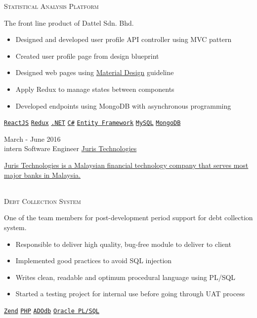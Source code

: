\documentclass[9pt]{developercv} %
\begin{document}
\begin{entrylist}
{		\textsc{Statistical Analysis Platform} \\
			{\small The front line product of Dattel Sdn. Bhd.
			\begin{itemize}
				\item Designed and developed user profile API controller using MVC pattern
				\item Created user profile page from design blueprint
				\item Designed web pages using \href{https://material.io/}{Material Design} guideline 
				\item Apply Redux to manage states between components
				\item Developed endpoints using MongoDB with asynchronous programming
			\end{itemize}}
			\texttt{\href{https://reactjs.org/}{ReactJS}}
				\slashsep
			\texttt{\href{https://redux.js.org/}{Redux}}
				\slashsep
			\texttt{\href{https://docs.microsoft.com/en-us/dotnet/standard/index}{.NET}}
				\slashsep
			\texttt{\href{https://docs.microsoft.com/en-us/dotnet/csharp/}{C\#}}
				\slashsep
			\texttt{\href{https://docs.microsoft.com/en-us/aspnet/entity-framework}{Entity Framework}}
				\slashsep
			\texttt{\href{https://www.mysql.com/}{MySQL}}
				\slashsep
			\texttt{\href{https://www.mongodb.com/}{MongoDB}}
		}
	\entry
		{March - June 2016\\\footnotesize{intern}}
		{Software Engineer}
		{\href{http://juristech.net/juristech/}{Juris Technologies}}
		{{\footnotesize{\href{http://juristech.net/juristech/about-us/}{Juris Technologies is a Malaysian financial technology company that serves most major banks in Malaysia.}}} \\
		\\ 
		{{\textsc{Debt Collection System}} \\
			{\small One of the team members for post-development period support for debt collection system.
			\begin{itemize}
				\item Responsible to deliver high quality, bug-free module to deliver to client
				\item Implemented good practices to avoid SQL injection
				\item Writes clean, readable and optimum procedural language using PL/SQL
				\item Started a testing project for internal use before going through UAT process
			\end{itemize}}
			\texttt{\href{https://framework.zend.com/}{Zend}}
				\slashsep
			\texttt{\href{https://secure.php.net/}{PHP}}
				\slashsep
			\texttt{\href{http://adodb.org/dokuwiki/doku.php}{ADOdb}}
				\slashsep
			\texttt{\href{https://www.oracle.com/technetwork/database/features/plsql/index.html}{Oracle PL/SQL}}
		}}
\end{entrylist}
\end{document}
